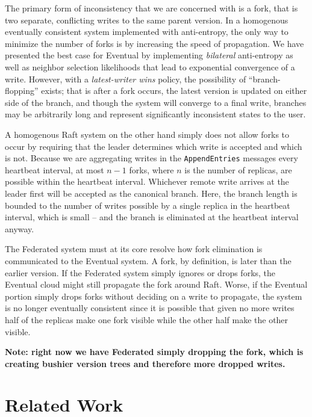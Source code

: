 \documentclass[10pt,conference,letterpaper]{IEEEtran}
\begin{document}
The primary form of inconsistency that we are concerned with is a fork, that is two separate, conflicting writes to the same parent version. In a homogenous eventually consistent system implemented with anti-entropy, the only way to minimize the number of forks is by increasing the speed of propagation. We have presented the best case for Eventual by implementing \textit{bilateral} anti-entropy as well as neighbor selection likelihoods that lead to exponential convergence of a write. However, with a \textit{latest-writer wins} policy, the possibility of ``branch-flopping'' exists; that is after a fork occurs, the latest version is updated on either side of the branch, and though the system will converge to a final write, branches may be arbitrarily long and represent significantly inconsistent states to the user.

A homogenous Raft system on the other hand simply does not allow forks to occur by requiring that the leader determines which write is accepted and which is not. Because we are aggregating writes in the \texttt{AppendEntries} messages every heartbeat interval, at most $n-1$ forks, where $n$ is the number of replicas, are possible within the heartbeat interval. Whichever remote write arrives at the leader first will be accepted as the canonical branch. Here, the branch length is bounded to the number of writes possible by a single replica in the heartbeat interval, which is small -- and the branch is eliminated at the heartbeat interval anyway.

The Federated system must at its core resolve how fork elimination is communicated to the Eventual system. A fork, by definition, is later than the earlier version. If the Federated system simply ignores or drops forks, the Eventual cloud might still propagate the fork around Raft. Worse, if the Eventual portion simply drops forks without deciding on a write to propagate, the system is no longer eventually consistent since it is possible that given no more writes half of the replicas make one fork visible while the other half make the other visible.

\textbf{Note: right now we have Federated simply dropping the fork, which is creating bushier version trees and therefore more dropped writes.}

\section{Related Work}
\end{document}
